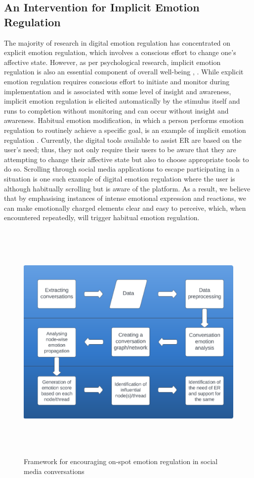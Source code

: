 \subsection{An Intervention for Implicit Emotion Regulation}
The majority of research in digital emotion regulation has concentrated on explicit emotion regulation, which involves a conscious effort to change one's affective state. However, as per psychological research, implicit emotion regulation is also an essential component of overall well-being \cite{gyurak2011explicit}, \cite{braunstein2017explicit}. While explicit emotion regulation requires conscious effort to initiate and monitor during implementation and is associated with some level of insight and awareness, implicit emotion regulation is elicited automatically by the stimulus itself and runs to completion without monitoring and can occur without insight and awareness. Habitual emotion modification, in which a person performs emotion regulation to routinely achieve a specific goal, is an example of implicit emotion regulation \cite{gross2006emotion}. 
Currently, the digital tools available to assist ER are based on the user's need; thus, they not only require their users to be aware that they are attempting to change their affective state but also to choose appropriate tools to do so. Scrolling through social media applications to escape participating in a situation is one such example of digital emotion regulation where the user is although habitually scrolling but is aware of the platform. As a result, we believe that by emphasising instances of intense emotional expression and reactions, we can make emotionally charged elements clear and easy to perceive, which, when encountered repeatedly, will trigger habitual emotion regulation.
\begin{figure}[h]
  
    \centering
    \includegraphics[width=12cm,height=12cm,keepaspectratio]{framework.pdf}
  \caption{Framework for encouraging on-spot emotion regulation in social media conversations}
  \label{fig:Framework}
  \end{figure} 
